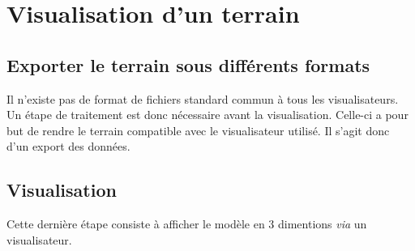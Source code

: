 \section{Visualisation d'un terrain}

\subsection{Exporter le terrain sous différents formats}
Il n'existe pas de format de fichiers standard commun à tous les visualisateurs. Un étape de traitement est donc nécessaire avant la visualisation. Celle-ci a pour but de rendre le terrain compatible avec le visualisateur utilisé. Il s'agit donc d'un export des données.

\subsection{Visualisation}
Cette dernière étape consiste à afficher le modèle en 3 dimentions \textit{via} un visualisateur.



\thispagestyle{empty}
